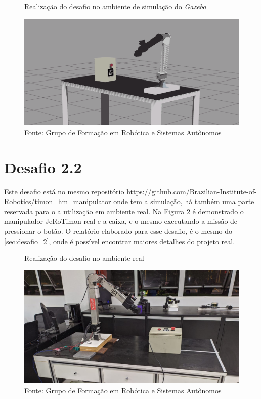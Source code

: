 \begin{figure}[H]
    \caption{Realização do desafio no ambiente de simulação do \textit{Gazebo}}
    \centering
    \includegraphics[width= \textwidth]{Figures/manipulador_simulacao.png}
    \caption*{Fonte: Grupo de Formação em Robótica e Sistemas Autônomos}
    \label{fig:manipulador_simulacao}
\end{figure}



\section{Desafio 2.2 }
\label{sec:desafio_2_2}
Este desafio está no mesmo repositório \url{https://github.com/Brazilian-Institute-of-Robotics/timon\_hm\_manipulator} onde tem a simulação, há também uma parte reservada para o a utilização em ambiente real. Na Figura \ref{fig:manipulador_real} é demonstrado o manipulador JeRoTimon real e a caixa, e o mesmo executando a missão de pressionar o botão. O relatório elaborado para esse desafio, é o mesmo do \ref{sec:desafio_2}, onde é possível encontrar maiores detalhes do projeto real.



\begin{figure}[H]
    \caption{Realização do desafio no ambiente real}
    \centering
    \includegraphics[width= \textwidth]{Figures/manipulador_real.png}
    \caption*{Fonte: Grupo de Formação em Robótica e Sistemas Autônomos}
    \label{fig:manipulador_real}
\end{figure}



